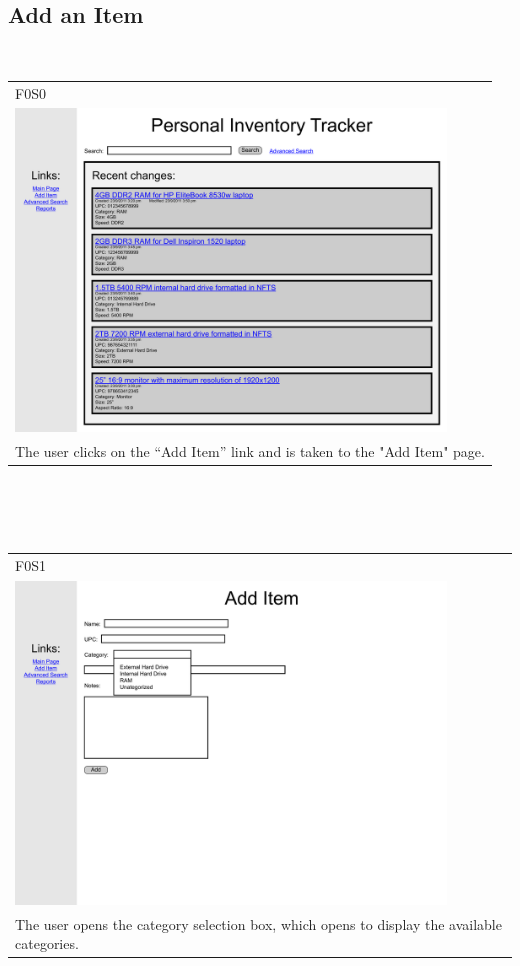 \documentclass{article}
\begin{document}
\subsection{Add an Item}
\clearpage
~\\
\begin{tabular}{ p{4.5in} }
F0S0\\
\includegraphics[keepaspectratio, width=4.5in]{addItemF0S0.pdf}\\
The user clicks on the ``Add Item'' link and is taken to the "Add Item" page. 
\end{tabular}\\
~\\
~\\
\begin{tabular}{ p{4.5in} }
F0S1\\
\includegraphics[keepaspectratio, width=4.5in]{addItemF0S1.pdf}\\
The user opens the category selection box, which opens to display the available categories.
\end{tabular}\\
\end{document}
